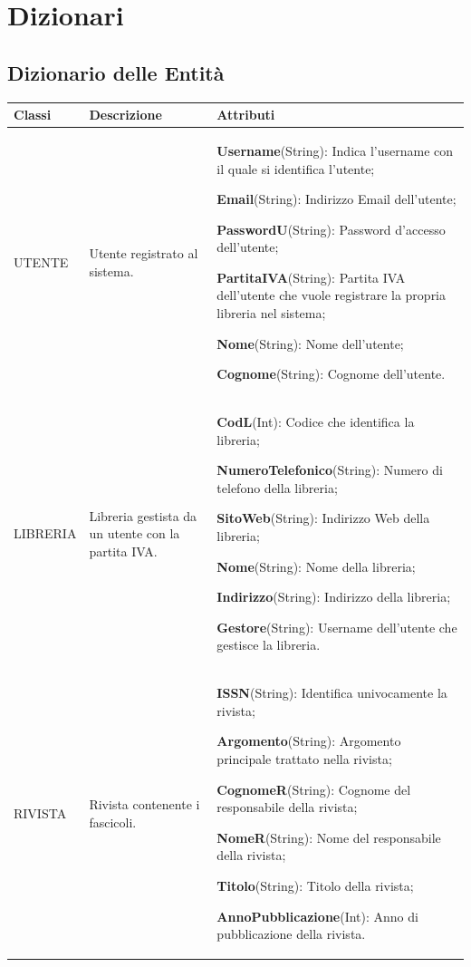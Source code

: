 \documentclass{article}
\begin{document}
\newpage
\section{Dizionari}

\subsection{Dizionario delle Entità}
\begin{table}[h]
\centering
\begin{tabular}{|p{5cm}|p{3cm}|p{7cm}|}
    \hline
    \textbf{Classi} & \textbf{Descrizione} & \textbf{Attributi} \\\hline

    UTENTE & Utente registrato al sistema. & \textbf{Username}(String): Indica l'username con il quale si identifica l'utente; \par
    \textbf{Email}(String): Indirizzo Email dell'utente; \par 
    \textbf{PasswordU}(String): Password d'accesso dell'utente; \par
    \textbf{PartitaIVA}(String): Partita IVA dell'utente che vuole registrare la propria libreria nel sistema; \par 
    \textbf{Nome}(String): Nome dell'utente; \par 
    \textbf{Cognome}(String): Cognome dell'utente.\\\hline

    LIBRERIA & Libreria gestista da un utente con la partita IVA. & \textbf{CodL}(Int): Codice che identifica la libreria; \par
    \textbf{NumeroTelefonico}(String): Numero di telefono della libreria; \par
    \textbf{SitoWeb}(String): Indirizzo Web della libreria; \par
    \textbf{Nome}(String): Nome della libreria; \par
    \textbf{Indirizzo}(String): Indirizzo della libreria; \par
    \textbf{Gestore}(String): Username dell'utente che gestisce la libreria.\\\hline
    
    RIVISTA & Rivista contenente i fascicoli. & \textbf{ISSN}(String): Identifica univocamente la rivista; \par
    \textbf{Argomento}(String): Argomento principale trattato nella rivista; \par
    \textbf{CognomeR}(String): Cognome del responsabile della rivista; \par
    \textbf{NomeR}(String): Nome del responsabile della rivista; \par
    \textbf{Titolo}(String): Titolo della rivista; \par
    \textbf{AnnoPubblicazione}(Int): Anno di pubblicazione della rivista.\\\hline
\end{tabular}
\end{table}
\end{document}
